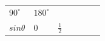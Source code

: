 {{\begin{center}
\begin{xtabular}[t]{|l|l|l|l|l|l|l|}
    
        
                  \begin{math}{90}^{\circ }\end{math}
                 &
    
    
        
                  \begin{math}{180}^{\circ }\end{math}
     \tabularnewline{}
    
    
        
                  \begin{math}sin\theta \end{math}
                 &
    
    
        0 &
    
    
        
                  \begin{math}\frac{1}{2}\end{math}
                 &
    
    
        

\end{xtabular}
\end{center}}}
